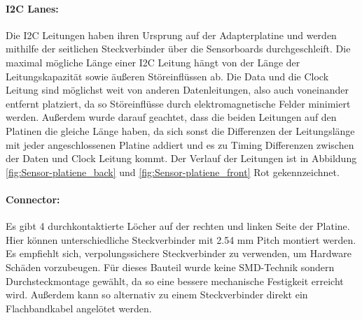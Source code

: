 \paragraph{I2C Lanes:}
Die I2C Leitungen haben ihren Ursprung auf der Adapterplatine und werden mithilfe der seitlichen Steckverbinder über die Sensorboards durchgeschleift.
Die maximal mögliche Länge einer I2C Leitung hängt von der Länge der Leitungskapazität sowie äußeren Störeinflüssen ab.
Die Data und die Clock Leitung sind möglichst weit von anderen Datenleitungen, also auch voneinander entfernt platziert, da so Störeinflüsse durch elektromagnetische Felder minimiert werden.
Außerdem wurde darauf geachtet, dass die beiden Leitungen auf den Platinen die gleiche Länge haben, da sich sonst die Differenzen der Leitungslänge mit jeder angeschlossenen Platine addiert und es zu Timing Differenzen zwischen der Daten und Clock Leitung kommt.
Der Verlauf der Leitungen ist in Abbildung \ref{fig:Sensor-platiene_back} und \ref{fig:Sensor-platiene_front} Rot gekennzeichnet.
\newpage
\noindent \paragraph{Connector:} Es gibt 4 durchkontaktierte Löcher auf der rechten und linken Seite der Platine. Hier können unterschiedliche Steckverbinder mit 2.54 mm Pitch montiert werden.
	Es empfiehlt sich, verpolungssichere Steckverbinder zu verwenden, um Hardware Schäden vorzubeugen.
	Für dieses Bauteil wurde keine SMD-Technik sondern Durchsteckmontage gewählt, da so eine bessere mechanische Festigkeit erreicht wird.
	Außerdem kann so alternativ zu einem Steckverbinder direkt ein Flachbandkabel angelötet werden.

